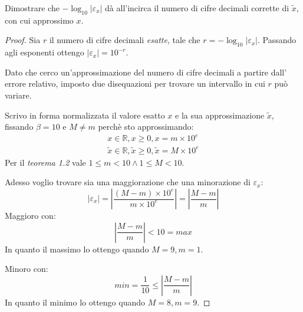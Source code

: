 \begin{exercise}
Dimostrare che $-\log_{10}{|\varepsilon_{x}|}$ d\`a all'incirca il numero 
di cifre decimali corrette di $\tilde{x}$, con cui approssimo $x$. 
\end{exercise}
\begin{proof}
Sia $r$ il numero di cifre decimali \emph{esatte}, tale che 
$r = -\log_{10}{|\varepsilon_{x}|}$. Passando agli esponenti ottengo 
$|\varepsilon_{x}| = 10^{-r}$.

Dato che cerco un'approssimazione del numero di cifre decimali a partire dall'
errore relativo, imposto due disequazioni per trovare un intervallo in cui $r$
pu\`o variare.

Scrivo in forma normalizzata il valore esatto $x$ e la sua approssimazione 
$\tilde{x}$, fissando $\beta = 10$ e $M \not = m$ perch\`e sto approssimando:
\begin{equation*}
	\begin{split}
		x \in \mathbb{R}, x \geq 0, x = m \times 10^{e} \\
		\tilde{x} \in \mathbb{R}, \tilde{x} \geq 0, \tilde{x} = M \times 10^{e}
	\end{split}
\end{equation*}
Per il \emph{teorema 1.2} vale $ 1 \leq m < 10 \wedge  1 \leq M < 10$.

Adesso voglio trovare sia una maggiorazione che una minorazione di 
$\varepsilon_{x}$:
\begin{equation*}
	\left | \varepsilon_{x} \right | = \left | \frac{(M - m) \times 10^{e}} 
		{m \times 10^{e}}
	\right | = \left | \frac{M - m}{m} \right |
\end{equation*}
Maggioro con:
\begin{equation*}
	\left | \frac{M - m}{m} \right | < 10 = max
\end{equation*}
In quanto il massimo lo ottengo quando $M = 9, m = 1$.

Minoro con:
\begin{equation*}
	min = \frac{1}{10} \le \left | \frac{M - m}{m} \right | 
\end{equation*}
In quanto il minimo lo ottengo quando $M = 8, m = 9$.


\end{proof}
